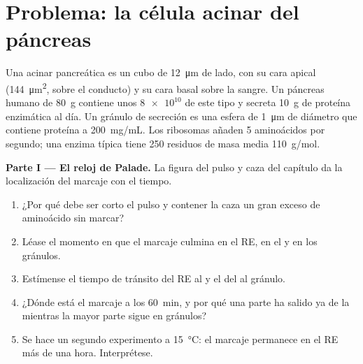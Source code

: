 \section{Problema: la célula acinar del páncreas}

\begin{problem}
\label{pb:b1:eukaryotic-cell:1}
Una  acinar pancreática es un cubo de \qty{12}{\micro m} de lado, con
su cara apical (\qty{144}{\micro m^2}, sobre el conducto) y su cara basal
sobre la sangre. Un páncreas humano de \qty{80}{g} contiene unos
$\num{8e10}$  de este tipo y secreta \qty{10}{g} de proteína
enzimática al día. Un gránulo de secreción es una esfera de \qty{1}{\micro m}
de diámetro que contiene proteína a \qty{200}{mg/mL}. Los ribosomas añaden
\qty{5}{} aminoácidos por segundo; una enzima típica tiene \qty{250}{}
residuos de masa media \qty{110}{g/mol}.

\medskip
\noindent\textbf{Parte I --- El reloj de Palade.}
La figura del pulso y caza del capítulo da la localización del marcaje con
el tiempo.
\begin{enumerate}
  \item ¿Por qué debe ser corto el pulso y contener la caza un gran exceso
        de aminoácido sin marcar?
  \item Léase el momento en que el marcaje culmina en el RE, en el  y
        en los gránulos.
  \item Estímense el tiempo de tránsito del RE al  y el del  al
        gránulo.
  \item ¿Dónde está el marcaje a los \qty{60}{min}, y por qué una parte ha
        salido ya de la  mientras la mayor parte sigue en gránulos?
  \item Se hace un segundo experimento a \qty{15}{\celsius}: el marcaje
        permanece en el RE más de una hora. Interprétese.
\end{enumerate}


\end{problem}
